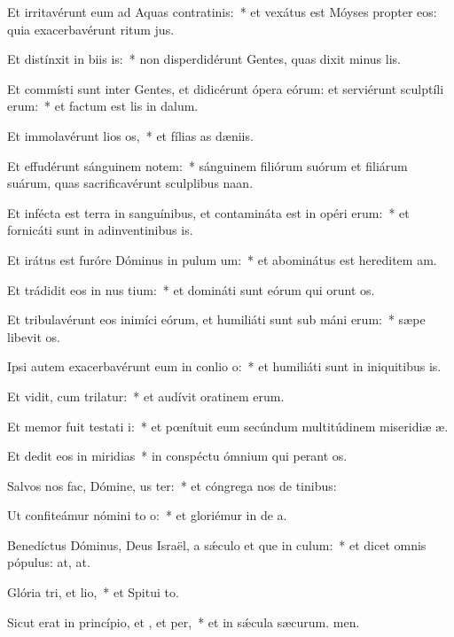 \item Et irritavérunt eum ad Aquas contratinis:~* et vexátus est Móyses propter eos: quia exacerbavérunt ritum jus.
\item Et distínxit in biis is:~* non disperdidérunt Gentes, quas dixit minus lis.
\item Et commísti sunt inter Gentes, et didicérunt ópera eórum: et serviérunt sculptíli erum:~* et factum est lis in dalum.
\item Et immolavérunt lios os,~* et fílias as dæniis.
\item Et effudérunt sánguinem notem:~* sánguinem filiórum suórum et filiárum suárum, quas sacrificavérunt sculplibus naan.
\item Et infécta est terra in sanguínibus, et contamináta est in opéri erum:~* et fornicáti sunt in adinventinibus is.
\item Et irátus est furóre Dóminus in pulum um:~* et abominátus est hereditem am.
\item Et trádidit eos in nus tium:~* et domináti sunt eórum qui orunt os.
\item Et tribulavérunt eos inimíci eórum, et humiliáti sunt sub máni erum:~* sæpe libevit os.
\item Ipsi autem exacerbavérunt eum in conlio o:~* et humiliáti sunt in iniquitibus is.
\item Et vidit, cum trilatur:~* et audívit oratinem erum.
\item Et memor fuit testati i:~* et pœnítuit eum secúndum multitúdinem miseridiæ æ.
\item Et dedit eos in miridias~* in conspéctu ómnium qui perant os.
\item Salvos nos fac, Dómine, us ter:~* et cóngrega nos de tinibus:
\item Ut confiteámur nómini to o:~* et gloriémur in de a.
\item Benedíctus Dóminus, Deus Israël, a sǽculo et que in culum:~* et dicet omnis pópulus: at, at.
\item Glória tri, et lio,~* et Spitui to.
\item Sicut erat in princípio, et , et per,~* et in sǽcula sæcurum. men.
